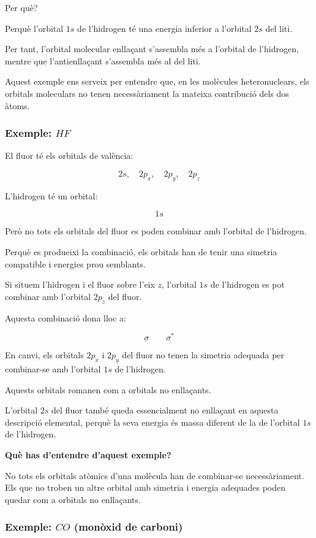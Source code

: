 \documentclass[12pt]{article}
\begin{document}
Per què?

Perquè l'orbital \(1s\) de l'hidrogen té una energia inferior
a l'orbital \(2s\) del liti.

Per tant, l'orbital molecular enllaçant s'assembla més
a l'orbital de l'hidrogen, mentre que l'antienllaçant
s'assembla més al del liti.

Aquest exemple ens serveix per entendre que, en les molècules
heteronuclears, els orbitals moleculars no tenen necessàriament
la mateixa contribució dels dos àtoms.


\subsubsection*{Exemple: \(HF\)}

El fluor té els orbitals de valència:

\[
2s,\quad 2p_x,\quad 2p_y,\quad 2p_z
\]

L'hidrogen té un orbital:

\[
1s
\]

Però no tots els orbitals del fluor es poden combinar
amb l'orbital de l'hidrogen.

Perquè es produeixi la combinació, els orbitals han de tenir
una simetria compatible i energies prou semblants.

Si situem l'hidrogen i el fluor sobre l'eix \(z\),
l'orbital \(1s\) de l'hidrogen es pot combinar amb
l'orbital \(2p_z\) del fluor.

Aquesta combinació dona lloc a:

\[
\sigma \qquad \sigma^*
\]

En canvi, els orbitals \(2p_x\) i \(2p_y\) del fluor
no tenen la simetria adequada per combinar-se amb
l'orbital \(1s\) de l'hidrogen.

Aquests orbitals romanen com a orbitals no enllaçants.

L'orbital \(2s\) del fluor també queda essencialment
no enllaçant en aquesta descripció elemental, perquè
la seva energia és massa diferent de la de l'orbital
\(1s\) de l'hidrogen.

\textbf{Què has d'entendre d'aquest exemple?}

No tots els orbitals atòmics d'una molècula han de combinar-se
necessàriament. Els que no troben un altre orbital amb simetria
i energia adequades poden quedar com a orbitals no enllaçants.


\subsubsection*{Exemple: \(CO\) (monòxid de carboni)}
\end{document}
